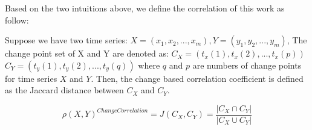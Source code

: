 Based on the two intuitions above, we define the correlation of this work as follow:
\begin{definition} 
Suppose we have two time series: $X=(x_1,x_2,...,x_m),Y=(y_1,y_2,...,y_m)$, The change point set of X and Y are denoted as: 
$C_X=(t_x(1),t_x(2),...,t_x(p))$
$C_Y=(t_y(1),t_y(2),...,t_y(q))$
where $q$ and $p$ are numbers of change points for time series $X$ and $Y$.
Then, the change based correlation coefficient is defined as the Jaccard distance \cite{han2011data} between $C_X$ and $C_Y$.

\begin{equation}
\rho(X,Y)^{ChangeCorrelation} = J(C_X,C_Y)=\frac{|C_X \cap C_Y|}{|C_X \cup C_Y|}
\end{equation}

\end{definition}